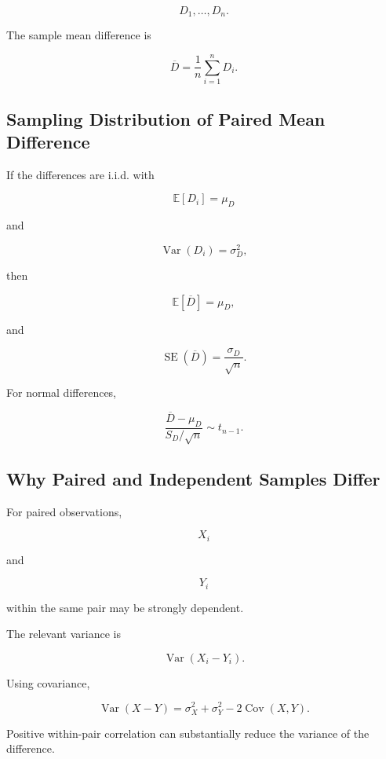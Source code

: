 \[
D_1,\ldots,D_n.
\]

The sample mean difference is

\[
\boxed{
\overline{D}
=
\frac1n
\sum_{i=1}^{n}D_i.
}
\]

\subsection{Sampling Distribution of Paired Mean Difference}
\label{subsec:paired-mean-sampling}

If the differences are i.i.d. with

\[
\mathbb{E}[D_i]=\mu_D
\]

and

\[
\operatorname{Var}(D_i)=\sigma_D^2,
\]

then

\[
\boxed{
\mathbb{E}[\overline{D}]
=
\mu_D,
}
\]

and

\[
\boxed{
\operatorname{SE}(\overline{D})
=
\frac{
\sigma_D
}{
\sqrt{n}
}.
}
\]

For normal differences,

\[
\boxed{
\frac{
\overline{D}-\mu_D
}{
S_D/\sqrt{n}
}
\sim
t_{n-1}.
}
\]

\subsection{Why Paired and Independent Samples Differ}
\label{subsec:paired-versus-independent}

For paired observations,

\[
X_i
\]

and

\[
Y_i
\]

within the same pair may be strongly dependent.

The relevant variance is

\[
\operatorname{Var}(X_i-Y_i).
\]

Using covariance,

\[
\boxed{
\operatorname{Var}(X-Y)
=
\sigma_X^2
+
\sigma_Y^2
-
2\operatorname{Cov}(X,Y).
}
\]

Positive within-pair correlation can substantially reduce the variance of
the difference.

